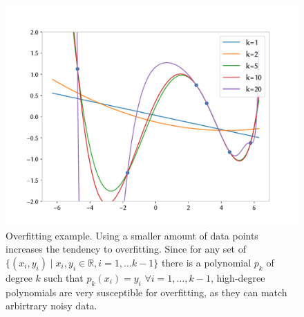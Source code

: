 \begin{answer}
    \begin{figure}[h]
        \centering
        \includegraphics*[width=.7\linewidth]{../src/featuremaps/part_e.pdf}
        \caption{Overfitting example. Using a smaller amount of data points increases the tendency to overfitting.
        Since for any set of $\{(x_i,y_i)\mid x_i, y_i \in \mathbb{R}, i=1,\ldots k-1\}$ there is a polynomial $p_k$ of degree $k$ such that $p_k(x_i) = y_i$ $\forall i=1,\ldots, k-1$, 
        high-degree polynomials are very susceptible for overfitting, as they can match arbirtrary noisy data.}
        \end{figure}
\end{answer}

